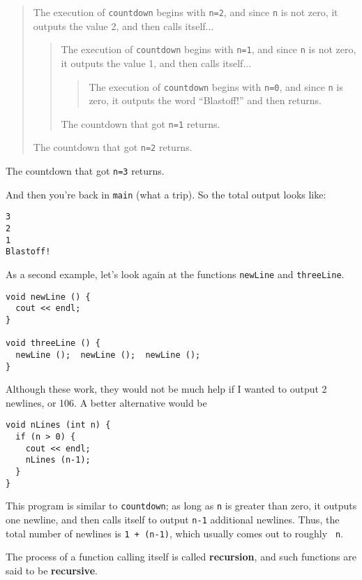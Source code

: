 \begin{quote}
The execution of {\tt countdown} begins with {\tt n=2}, and
since {\tt n} is not zero, it outputs the value 2, and then
calls itself...

\begin{quote}
The execution of {\tt countdown} begins with {\tt n=1}, and
since {\tt n} is not zero, it outputs the value 1, and then
calls itself...

\begin{quote}
The execution of {\tt countdown} begins with {\tt n=0}, and
since {\tt n} is zero, it outputs the word ``Blastoff!''
and then returns.
\end{quote}

The countdown that got {\tt n=1} returns.

\end{quote}

The countdown that got {\tt n=2} returns.

\end{quote}

The countdown that got {\tt n=3} returns.

\noindent And then you're back in {\tt main} (what a trip).  So the
total output looks like:

\begin{lstlisting}
3
2
1
Blastoff!
\end{lstlisting}
%
As a second example, let's look again at the functions
{\tt newLine} and {\tt threeLine}.

\begin{lstlisting}
void newLine () {
  cout << endl;
}

void threeLine () {
  newLine ();  newLine ();  newLine ();
}
\end{lstlisting}
%
Although these work, they would not be much help if I wanted
to output 2 newlines, or 106.  A better alternative would be

\begin{lstlisting}
void nLines (int n) {
  if (n > 0) {
    cout << endl;
    nLines (n-1);
  }
}
\end{lstlisting}
%
This program is similar to {\tt countdown}; as long as {\tt n} is
greater than zero, it outputs one newline, and then calls itself to
output {\tt n-1} additional newlines.  Thus, the total number of
newlines is {\tt 1 + (n-1)}, which usually comes out to roughly {\tt
n}.


The process of a function calling itself is called {\bf recursion}, and
such functions are said to be {\bf recursive}.

